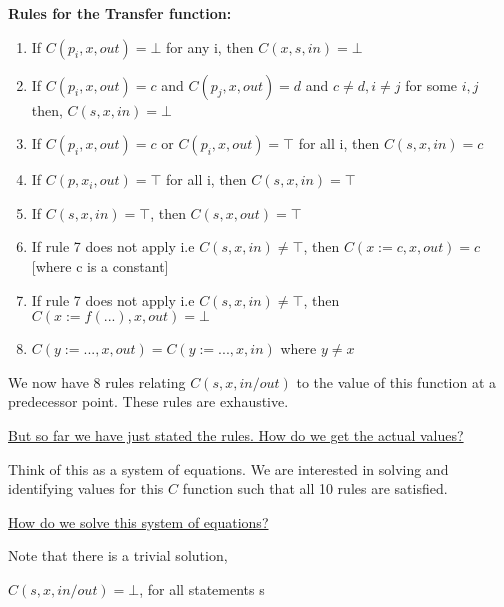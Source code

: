 \vspace{0.3cm}

\textbf{Rules for the Transfer function:}

\begin{enumerate}
    \item If $C(p_i, x, out) = \bot$ for any i, then $C(x, s, in) = \bot$
    \item If $C(p_i, x, out) = c$ and $C(p_j, x, out) = d$ and $c \neq d, i \neq j$ for some $i, j$ then, $C(s,x,in) = \bot$
    \item If $C(p_i, x, out) = c$ or $C(p_i, x, out) = \top$ for all i, then $C(s, x, in) = c$
    \item If $C(p, x_i, out) = \top$ for all i, then $C(s, x, in) = \top$
    \item If $C(s, x, in) = \top$, then $C(s, x, out) = \top$
    \item If rule 7 does not apply i.e $C(s,x,in) \neq \top$, then $C(x := c, x, out) = c$ [where c is a constant]
    \item If rule 7 does not apply i.e $C(s,x,in) \neq \top$, then $C(x := f(...), x, out) = \bot$
    \item $C(y := ..., x, out) = C(y:=..., x, in)$ where $y \neq x$
\end{enumerate}

We now have 8 rules relating $C(s, x, in/out)$ to the value of this function at a predecessor point. These rules are exhaustive.

\vspace{0.3cm}

\underline{But so far we have just stated the rules. How do we get the actual values?}

\vspace{0.3cm}

Think of this as a system of equations. We are interested in solving and identifying values for this $C$ function such that all 10 rules are satisfied.

\vspace{0.3cm}

\underline{How do we solve this system of equations?}

\vspace{0.3cm}

Note that there is a trivial solution,

\begin{center}
    $C(s, x, in/out) = \bot$, for all statements s
\end{center}

